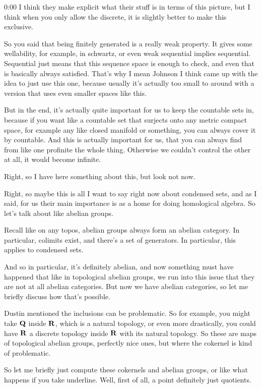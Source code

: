 \begin{unfinished}{0:00}
I think they make explicit what their stuff is in terms of this picture, but I think when you only allow the discrete, it is slightly better to make this exclusive.

So you said that being finitely generated is a really weak property. It gives some wellability, for example, in schwartz, or even weak sequential implies sequential. Sequential just means that this sequence space is enough to check, and even that is basically always satisfied. That's why I mean Johnson I think came up with the idea to just use this one, because usually it's actually too small to around with a version that uses even smaller spaces like this.

But in the end, it's actually quite important for us to keep the countable sets in, because if you want like a countable set that surjects onto any metric compact space, for example any like closed manifold or something, you can always cover it by countable. And this is actually important for us, that you can always find from like one profinite the whole thing. Otherwise we couldn't control the other at all, it would become infinite.

Right, so I have here something about this, but look not now.

Right, so maybe this is all I want to say right now about condensed sets, and as I said, for us their main importance is as a home for doing homological algebra. So let's talk about like abelian groups.

Recall like on any topos, abelian groups always form an abelian category. In particular, colimits exist, and there's a set of generators. In particular, this applies to condensed sets.

And so in particular, it's definitely abelian, and now something must have happened that like in topological abelian groups, we run into this issue that they are not at all abelian categories. But now we have abelian categories, so let me briefly discuss how that's possible.

Dustin mentioned the inclusions can be problematic. So for example, you might take $\mathbf Q$ inside $\mathbf R$, which is a natural topology, or even more drastically, you could have $\mathbf R$ a discrete topology inside $\mathbf R$ with its natural topology. So these are maps of topological abelian groups, perfectly nice ones, but where the cokernel is kind of problematic.

So let me briefly just compute these cokernels and abelian groups, or like what happens if you take underline. Well, first of all, a point definitely just quotients.


\end{unfinished}
